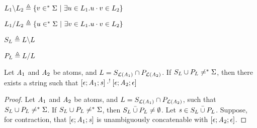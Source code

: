 \begin{definition}
$L_1\backslash L_2\triangleq \{v \in ^*{\Sigma}~|~ \exists u\in L_1. u\cdot v\in L_2\}$
\end{definition}

\begin{definition}
$L_1\slash L_2\triangleq \{u \in ^*{\Sigma}~|~ \exists v\in L_1. u\cdot v\in L_2\}$
\end{definition}

\begin{definition}[Suffixes]
$S_{L}\triangleq L\backslash L$
\end{definition}

\begin{definition}[Prefixes]
$P_{L}\triangleq L\slash L$
\end{definition}

\begin{lemma}
Let $\mathit{A}_1$ and $\mathit{A}_2$ be atoms, and
$L=S_{\mathcal{L}(\mathit{A}_1)}\cap P_{\mathcal{L}(\mathit{A}_2)}$.
If $S_{L}\cup P_{L}\neq^*{\Sigma}$, then there exists a string \String{} such that
$[\epsilon;\mathit{A}_1;\mathit{s}] \cdot^! [\epsilon;\mathit{A}_2;\epsilon]$
\begin{proof}
Let $\mathit{A}_1$ and $\mathit{A}_2$ be atoms, and
$L=S_{\mathcal{L}(\mathit{A}_1)}\cap P_{\mathcal{L}(\mathit{A}_2)}$,
such that $S_{L}\cup P_{L}\neq^*{\Sigma}$.
If $S_{L}\cup P_{L}\neq^*{\Sigma}$, then $\bar{S_{L}\cup P_{L}}\neq\emptyset$.
Let $\mathit{s}\in\bar{S_{L}\cup P_{L}}$.
Suppose, for contraction, that $[\epsilon;\mathit{A}_1;\mathit{s}]$ is unambiguously concatenable
with ${[\epsilon;\mathit{A}_2;\epsilon]}$.
\end{proof}
\end{lemma}

